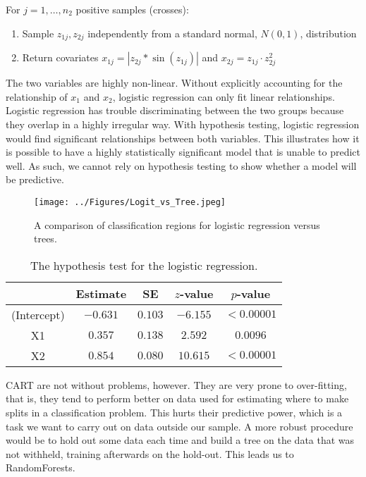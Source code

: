 \documentclass[11pt]{article}
\begin{document}
For $j = 1, \dots, n_2$ positive samples (crosses):
\begin{enumerate}
\item Sample $z_{1j}, z_{2j}$ independently from a standard normal, $N(0,1)$, distribution
\item Return covariates $x_{1j} = |z_{2j}*\sin(z_{1j})|$ and $x_{2j} = z_{1j} \cdot z_{2j}^2$
\end{enumerate}

The two variables are highly non-linear. Without explicitly accounting for the relationship of $x_1$ and $x_2$, logistic regression can only fit linear relationships. Logistic regression has trouble discriminating between the two groups because they overlap in a highly irregular way. With hypothesis testing, logistic regression would find significant relationships between both variables. This illustrates how it is possible to have a highly statistically significant model that is unable to predict well. As such, we cannot rely on hypothesis testing to show whether a model will be predictive.

\begin{figure}[H] \center
\texttt{[image: ../Figures/Logit\_vs\_Tree.jpeg]} 
\caption{A comparison of classification regions for logistic regression versus trees.}
\end{figure}

\begin{table}[H] \center
\caption{The hypothesis test for the logistic regression.}
\begin{tabular}{|c|c|c|c|c|} \hline
& Estimate & SE & $z$-value & $p$-value \\ \hline
(Intercept) & $-0.631$ & $0.103$ & $-6.155$ & $<0.00001$ \\ \hline
X1 & $0.357$ & $0.138$ & $2.592$ & $0.0096$ \\ \hline
X2 & $0.854$ & $0.080$ & $10.615$ & $<0.00001$ \\ \hline
\end{tabular}
\end{table}

CART are not without problems, however. They are very prone to over-fitting, that is, they tend to perform better on data used for estimating where to make splits in a classification problem. This hurts their predictive power, which is a task we want to carry out on data outside our sample. A more robust procedure would be to hold out some data each time and build a tree on the data that was not withheld, training afterwards on the hold-out. This leads us to RandomForests.
\end{document}
